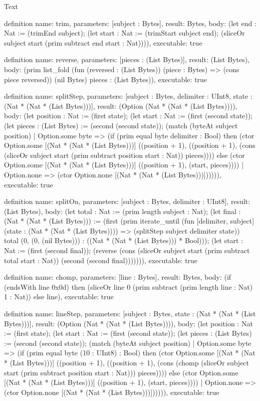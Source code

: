 \begin{lexlean}{Text}
\begin{semanticmodule}
definition{
  name: trim,
  parameters: [subject : Bytes],
  result: Bytes,
  body: (let end : Nat := (trimEnd subject); (let start : Nat := (trimStart subject end); (sliceOr subject start (prim subtract end start : Nat)))),
  executable: true
}

definition{
  name: reverse,
  parameters: [pieces : (List Bytes)],
  result: (List Bytes),
  body: (prim list_fold (fun (reversed : (List Bytes)) (piece : Bytes) => (cons piece reversed)) (nil Bytes) pieces : (List Bytes)),
  executable: true
}

definition{
  name: splitStep,
  parameters: [subject : Bytes, delimiter : UInt8, state : (Nat * (Nat * (List Bytes)))],
  result: (Option (Nat * (Nat * (List Bytes)))),
  body: (let position : Nat := (first state); (let start : Nat := (first (second state)); (let pieces : (List Bytes) := (second (second state)); (match (byteAt subject position)
    | Option.some byte => (if (prim equal byte delimiter : Bool) then (ctor Option.some [(Nat * (Nat * (List Bytes)))] ((position + 1), ((position + 1), (cons (sliceOr subject start (prim subtract position start : Nat)) pieces)))) else (ctor Option.some [(Nat * (Nat * (List Bytes)))] ((position + 1), (start, pieces))))
    | Option.none => (ctor Option.none [(Nat * (Nat * (List Bytes)))]))))),
  executable: true
}

definition{
  name: splitOn,
  parameters: [subject : Bytes, delimiter : UInt8],
  result: (List Bytes),
  body: (let total : Nat := (prim length subject : Nat); (let final : (Nat * (Nat * (List Bytes))) := (first (prim iterate_until (fun [delimiter, subject] (state : (Nat * (Nat * (List Bytes)))) => (splitStep subject delimiter state)) total (0, (0, (nil Bytes))) : ((Nat * (Nat * (List Bytes))) * Bool))); (let start : Nat := (first (second final)); (reverse (cons (sliceOr subject start (prim subtract total start : Nat)) (second (second final))))))),
  executable: true
}

definition{
  name: chomp,
  parameters: [line : Bytes],
  result: Bytes,
  body: (if (endsWith line 0x0d) then (sliceOr line 0 (prim subtract (prim length line : Nat) 1 : Nat)) else line),
  executable: true
}

definition{
  name: lineStep,
  parameters: [subject : Bytes, state : (Nat * (Nat * (List Bytes)))],
  result: (Option (Nat * (Nat * (List Bytes)))),
  body: (let position : Nat := (first state); (let start : Nat := (first (second state)); (let pieces : (List Bytes) := (second (second state)); (match (byteAt subject position)
    | Option.some byte => (if (prim equal byte (10 : UInt8) : Bool) then (ctor Option.some [(Nat * (Nat * (List Bytes)))] ((position + 1), ((position + 1), (cons (chomp (sliceOr subject start (prim subtract position start : Nat))) pieces)))) else (ctor Option.some [(Nat * (Nat * (List Bytes)))] ((position + 1), (start, pieces))))
    | Option.none => (ctor Option.none [(Nat * (Nat * (List Bytes)))]))))),
  executable: true
}


\end{semanticmodule}
\end{lexlean}
